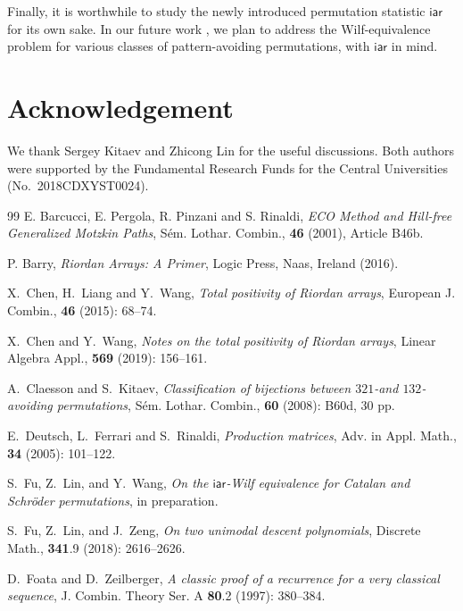 \documentclass[11pt,reqno]{amsart}
\numberwithin{equation}{section}
\theoremstyle{plain}
\theoremstyle{definition}
\def\iar{\mathsf{iar}}
\begin{document}
Finally, it is worthwhile to study the newly introduced permutation statistic $\iar$ for its own sake. In our future work \cite{FLW}, we plan to address the Wilf-equivalence problem for various classes of pattern-avoiding permutations, with $\iar$ in mind.


\section*{Acknowledgement}
We thank Sergey Kitaev and Zhicong Lin for the useful discussions. Both authors were supported by the Fundamental Research Funds for the Central Universities (No.~2018CDXYST0024). 



\begin{thebibliography}{99}
 E. Barcucci, E. Pergola, R. Pinzani and S. Rinaldi, \textit{ECO Method and Hill-free Generalized Motzkin Paths}, S\'{e}m. Lothar. Combin., \textbf{46} (2001), Article B46b.

 P. Barry, \textit{Riordan Arrays: A Primer}, Logic Press, Naas, Ireland (2016).





 X.~Chen, H.~Liang and Y.~Wang, \textit{Total positivity of Riordan arrays}, European J. Combin., {\bf 46} (2015): 68--74.

 X.~Chen and Y.~Wang, \textit{Notes on the total positivity of Riordan arrays}, Linear Algebra Appl., {\bf 569} (2019): 156--161.

 A.~Claesson and S.~Kitaev, \textit{Classification of bijections between $321$-and $132$-avoiding permutations}, S\'em. Lothar. Combin., {\bf 60} (2008): B60d, 30 pp.

 E.~Deutsch, L.~Ferrari and S.~Rinaldi, \textit{Production matrices}, Adv. in Appl. Math., {\bf 34} (2005): 101--122.



 S.~Fu, Z.~Lin, and Y.~Wang, \textit{On the $\iar$-Wilf equivalence for Catalan and Schr\"oder permutations}, in preparation.

 S.~Fu, Z.~Lin, and J.~Zeng, \textit{On two unimodal descent polynomials}, Discrete Math., {\bf 341}.9 (2018): 2616--2626.

 D.~Foata and D.~Zeilberger, \textit{A classic proof of a recurrence for a very classical sequence}, J. Combin. Theory Ser. A {\bf 80}.2 (1997): 380--384.




\end{thebibliography}
\end{document}
